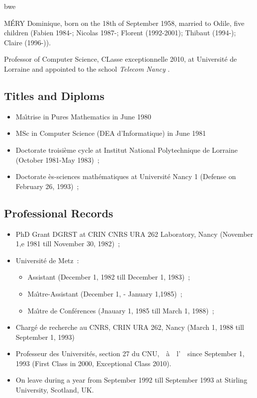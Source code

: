 \documentclass[ 12pt]{article}
\begin{document}
\newcommand{\inpl}{Institut National Polytechnique de Lorraine}

\newcommand{\pr}{Professeur des Universit\'es, section 27 du CNU,}bwe 

\noindent
M\'ERY Dominique,  born on  the  18th of  September 1958,   married to
Odile, five   children     (Fabien 1984-; Nicolas    1987-;    Florent
(1992-2001); Thibaut (1994-); Claire (1996-)).

\noindent
Professor of Computer Science, CLasse exceptionnelle 2010,    at Universit\'e de Lorraine and appointed to the  school \textit{Telecom Nancy }.

\subsection{Titles and Diploms}

\begin{itemize}
\item Ma\^{\i}trise in Pures Mathematics in June 1980
\item MSc in Computer Science (DEA d'Informatique) in June  1981
\item Doctorate troisi\`eme cycle  at Institut National Polytechnique de Lorraine  (October 1981-May 1983)~;
\item Doctorate \`es-sciences math\'ematiques at Universit\'e Nancy 1 (Defense on February 26, 1993)~;
\end{itemize}

\subsection{Professional Records}


\begin{itemize}
\item PhD Grant  DGRST  at  CRIN CNRS URA 262 Laboratory,   Nancy  (November 1,e 1981 till November 30, 1982)~;
\item Universit\'e de Metz~:
  \begin{itemize}
  \item Assistant  (December 1,  1982 till December 1,  1983)~;
  \item Ma\^{\i}tre-Assistant (December 1, - January 1,1985)~;
  \item Ma\^{\i}tre de Conf\'erences (Jnauary 1, 1985 till March 1, 1988)~;
  \end{itemize}
\item Charg\'e de recherche au CNRS, CRIN URA 262, Nancy (March 1, 1988 till  September 1, 1993)
\item \pr~~\`a~~l'~\inancyIesial\ since September 1, 1993 (First Class in 2000, Exceptional Class 2010).


\item On leave  during a year  from September 1992 till September 1993 at Stirling University, Scotland, UK.


\end{itemize}
\end{document}
